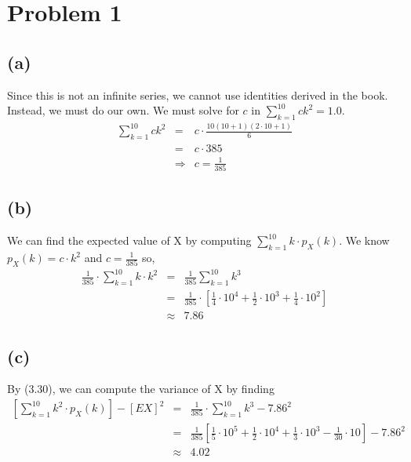 \documentclass{article}
\begin{document}
\thispagestyle{fancy}

\section*{Problem 1} 

\subsection*{(a)}

Since this is not an infinite series, we cannot use identities derived in the
book. Instead, we must do our own. We must solve for $c$ in
$\displaystyle\sum\limits_{k=1}^{10} ck^2 = 1.0$.
\begin{eqnarray*}
  \sum\limits_{k=1}^{10} ck^2 &=& c \cdot \frac{10(10 + 1)(2\cdot10+1)}{6} \\
  &=& c\cdot 385 \\
  &\Rightarrow& c = \frac{1}{385}
\end{eqnarray*}

\subsection*{(b)}

We can find the expected value of X by computing $\sum\limits_{k=1}^{10} k\cdot
p_{X}(k)$. We know $p_{X}(k) = c\cdot k^2$ and $c = \frac{1}{385}$ so,
\begin{eqnarray*}
  \frac{1}{385}\cdot\sum\limits_{k=1}^{10} k\cdot k^2 &=& \frac{1}{385}
  \sum\limits_{k=1}^{10} k^3 \\
  &=& \frac{1}{385} \cdot \left[ \frac{1}{4}\cdot10^4 + \frac{1}{2}\cdot10^3 +
  \frac{1}{4}\cdot10^2\right] \\
  &\approx& 7.86
\end{eqnarray*}

\subsection*{(c)}

By (3.30), we can compute the variance of X by finding
\begin{eqnarray*}
  \left[\sum\limits_{k=1}^{10} k^2\cdot p_{X}(k) \right] - [EX]^2 &=&
  \frac{1}{385}\cdot \sum\limits_{k=1}^{10} k^3 - 7.86^2 \\
  &=& \frac{1}{385}\left[ \frac{1}{5}\cdot10^5 + \frac{1}{2}\cdot10^4 +
  \frac{1}{3}\cdot10^3 - \frac{1}{30}\cdot10\right] - 7.86^2 \\
  &\approx& 4.02
\end{eqnarray*}
\end{document}
